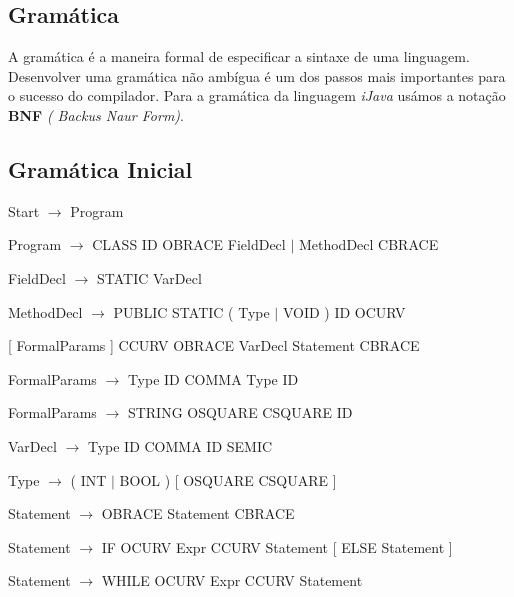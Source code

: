 \documentclass[12pt]{article}
\begin{document}
\subsection{Gramática}




A gramática é a maneira formal de especificar a sintaxe de uma linguagem. 
Desenvolver uma gramática não ambígua é um dos passos mais importantes para o sucesso do compilador. Para a gramática da linguagem \emph{iJava} usámos a notação \textbf{BNF} \emph{( Backus Naur Form)}. 


\subsection{Gramática Inicial}

\vspace{0.5cm}

\hspace{-1cm}Start $\rightarrow$ Program

\hspace{-1cm}Program $\rightarrow$ CLASS ID OBRACE { FieldDecl $\mid$ MethodDecl } CBRACE

\hspace{-1cm}FieldDecl $\rightarrow$ STATIC VarDecl

\hspace{-1cm}MethodDecl $\rightarrow$ PUBLIC STATIC ( Type $\mid$ VOID ) ID OCURV

[ FormalParams ] CCURV OBRACE { VarDecl } { Statement } CBRACE

\hspace{-1cm}FormalParams $\rightarrow$ Type ID { COMMA Type ID }

\hspace{-1cm}FormalParams $\rightarrow$ STRING OSQUARE CSQUARE ID

\hspace{-1cm}VarDecl $\rightarrow$ Type ID { COMMA ID } SEMIC

\hspace{-1cm}Type $\rightarrow$ ( INT $\mid$ BOOL ) [ OSQUARE CSQUARE ]

\hspace{-1cm}Statement $\rightarrow$ OBRACE { Statement } CBRACE

\hspace{-1cm}Statement $\rightarrow$ IF OCURV Expr CCURV Statement [ ELSE Statement ]

\hspace{-1cm}Statement $\rightarrow$ WHILE OCURV Expr CCURV Statement
\end{document}
